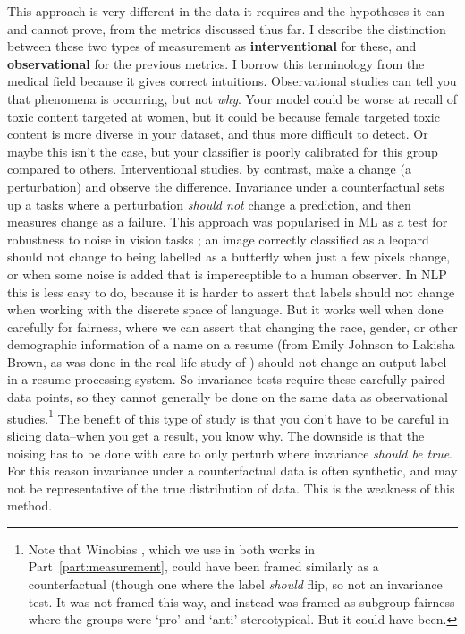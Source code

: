 This approach is very different in the data it requires and the hypotheses it can and cannot prove, from the metrics discussed thus far. I describe the distinction between these two types of measurement as \textbf{interventional} for these, and \textbf{observational} for the previous metrics. I borrow this terminology from the medical field because it gives correct intuitions. Observational studies can tell you that phenomena is occurring, but not \textit{why}. Your model could be worse at recall of toxic content targeted at women, but it could be because female targeted toxic content is more diverse in your dataset, and thus more difficult to detect. Or maybe this isn't the case, but your classifier is poorly calibrated for this group compared to others. Interventional studies, by contrast, make a change (a perturbation) and observe the difference. Invariance under a counterfactual sets up a tasks where a perturbation \textit{should not} change a prediction, and then measures change as a failure. This approach was popularised in ML as a test for robustness to noise in vision tasks \citep{Zheng2016ImprovingTR}; an image correctly classified as a leopard should not change to being labelled as a butterfly when just a few pixels change, or when some noise is added that is imperceptible to a human observer. In NLP this is less easy to do, because it is harder to assert that labels should not change when working with the discrete space of language. But it works well when done carefully for fairness, where we can assert that changing the race, gender, or other demographic information of a name on a resume (from Emily Johnson to Lakisha Brown, as was done in the real life study of \citet{bertrand2004emily}) should not change an output label in a resume processing system. So invariance tests require these carefully paired data points, so they cannot generally be done on the same data as observational studies.\footnote{Note that Winobias \citep{zhao-etal-2018-gender}, which we use in both works in Part~\ref{part:measurement}, could have been framed similarly as a counterfactual (though one where the label \textit{should} flip, so not an invariance test. It was not framed this way, and instead was framed as subgroup fairness where the groups were `pro' and `anti' stereotypical. But it could have been.} The benefit of this type of study is that you don't have to be careful in slicing data--when you get a result, you know why. The downside is that the noising has to be done with care to only perturb where invariance \textit{should be true}. For this reason invariance under a counterfactual data is often synthetic, and may not be representative of the true distribution of data. This is the weakness of this method.

